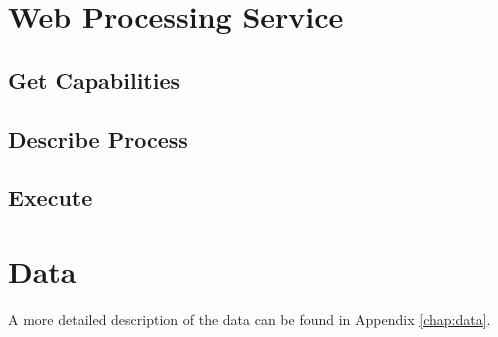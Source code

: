 

\section{Web Processing Service}

\subsection{Get Capabilities}

\subsection{Describe Process}

\subsection{Execute}

\section{Data}
A more detailed description of the data can be found in Appendix \ref{chap:data}.
